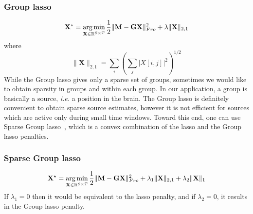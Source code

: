 \subsubsection*{Group \ac{lasso}}
\vspace{-10pt}
\begin{equation} \label{eq_glasso}
	\mathbf{X}^\star = \mathop{\mathrm{arg}\,\mathrm{min}}_{\mathbf{X}\in\mathbb{R}^{S\times T}}\frac{1}{2}\|\mathbf{M}-\mathbf{GX}\|_{Fro}^2 + \lambda\|\mathbf{X}\|_{2,1}
\end{equation}
where
\begin{equation*}	\|\mathbf{X}\|_{2,1}=\sum_i\left(\sum_j|X[i,j]|^2\right)^{1/2}
\end{equation*}
\endadjustwidth
While the Group \ac{lasso} gives only a sparse set of groups, sometimes we would like to obtain sparsity in groups and within each group. In our application, a group is basically a source, \textit{i.e.} a position in the brain. The Group \ac{lasso} is definitely convenient to obtain sparse source estimates, however it is not efficient for sources which are active only during small time windows. Toward this end, one can use Sparse Group \ac{lasso}~\cite{simon2013sparse}, which is a convex combination of the \ac{lasso} and the Group \ac{lasso} penalties.
\adjustwidth{1em}{0pt}

\subsubsection*{Sparse Group \ac{lasso}}
\begin{equation} \label{eq_sglasso}
	\mathbf{X}^\star = \mathop{\mathrm{arg}\,\mathrm{min}}_{\mathbf{X}\in\mathbb{R}^{S\times T}}\frac{1}{2}\|\mathbf{M}-\mathbf{GX}\|_{Fro}^2 + \lambda_1\|\mathbf{X}\|_{2,1} + \lambda_2\|\mathbf{X}\|_1
\end{equation}
If $\lambda_1=0$ then it would be equivalent to the \ac{lasso} penalty, and if $\lambda_2=0$, it results in the Group \ac{lasso} penalty.
\endadjustwidth

